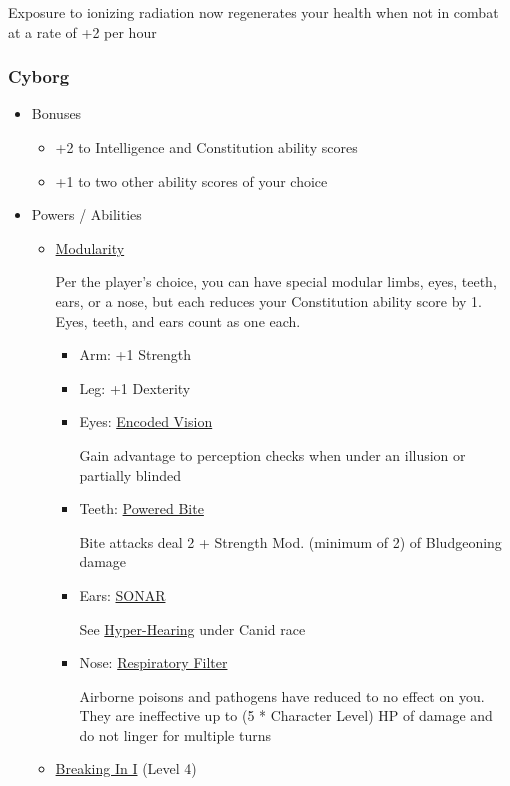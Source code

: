 \documentclass[12pt, landscape]{article}
\begin{document}
\begin{FlushLeft}
\begin{multicols}{2}
\begin{itemize}[wide]
\begin{itemize}
					Exposure to ionizing radiation now regenerates your health when not in combat at a rate of +2 per hour
				\end{itemize}
			\end{itemize}

			\subsubsection{Cyborg}
			\begin{itemize}[wide]
				\item Bonuses
				\begin{itemize}
					\item +2 to Intelligence and Constitution ability scores
					\item +1 to two other ability scores of your choice
				\end{itemize}
				\item Powers / Abilities
				\begin{itemize}
					\item \underline{Modularity}

					Per the player’s choice, you can have special modular limbs, eyes, teeth, ears, or a nose, but each reduces your Constitution ability score by 1.
					Eyes, teeth, and ears count as one each.
					\vfill \null \columnbreak
					\begin{itemize}
						\item Arm: +1 Strength
						\item Leg: +1 Dexterity
						\item Eyes: \underline{Encoded Vision}

						Gain advantage to perception checks when under an illusion or partially blinded
						\item Teeth: \underline{Powered Bite}

						Bite attacks deal 2 + Strength Mod. (minimum of 2) of Bludgeoning damage
						\item Ears: \underline{SONAR}

						See \underline{Hyper-Hearing} under Canid race
						\item Nose: \underline{Respiratory Filter}

						Airborne poisons and pathogens have reduced to no effect on you.
						They are ineffective up to (5 * Character Level) HP of damage and do not linger for multiple turns
					\end{itemize}
					\item \underline{Breaking In I} (Level 4)


\end{itemize}
\end{itemize}
\end{multicols}
\end{FlushLeft}
\end{document}
